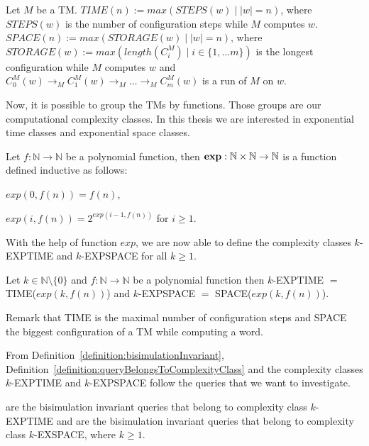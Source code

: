 \begin{definition}
    Let $M$ be a TM. $TIME(n):= max(STEPS(w)\mid |w| = n)$, where $STEPS(w)$ is the number of configuration steps while
    $M$ computes $w$. $SPACE(n) := max(STORAGE(w)\mid |w| = n)$, where $STORAGE(w) := max(length(C_i^M)\mid i\in\{1,
    \dots m\})$ is the longest configuration while $M$ computes $w$ and $C_0^M(w) \rightarrow_M C_1^M(w) \rightarrow_M \dots
    \rightarrow_M C_m^M(w)$ is a run of $M$ on $w$.
\end{definition}

Now, it is possible to group the TMs by functions. Those groups are our computational complexity classes. In this
thesis we are interested in exponential time classes and exponential space classes.

\begin{definition}
    Let $f: \mathbb{N} \rightarrow \mathbb{N}$ be a polynomial function, then $\emph{exp}: \mathbb{N} \times \mathbb{N}
    \rightarrow \mathbb{N}$ is a function defined inductive as follows:
    \begin{compactitem}
        \item $exp(0, f(n)) = f(n)$,
        \item $exp(i, f(n)) = 2^{exp(i - 1, f(n))}$ for $i \geq 1$.
    \end{compactitem}
\end{definition}

With the help of function $exp$, we are now able to define the complexity classes $k$-EXPTIME and $k$-EXPSPACE for
all $k \geq 1$.

\begin{definition}
    Let $k \in \mathbb{N} \setminus \{0\}$ and $f: \mathbb{N} \rightarrow \mathbb{N}$ be a polynomial function then
    $k$-EXPTIME $=$ TIME($exp(k, f(n))$) and $k$-EXPSPACE $=$ SPACE($exp(k, f(n))$).
\end{definition}

Remark that TIME is the maximal number of configuration steps and SPACE the biggest configuration of a TM
while computing a word.

From Definition~\ref{definition:bisimulationInvariant}, Definition~\ref{definition:queryBelongsToComplexityClass}
and the complexity classes $k$-EXPTIME and $k$-EXPSPACE follow the queries that we want to investigate.

\begin{definition}
    \label{definition:kExptimekExpspace}
     are the bisimulation invariant queries that belong to complexity class $k$-EXPTIME and
     are the bisimulation invariant queries that belong to complexity class $k$-EXSPACE, where $k \geq 1$.
\end{definition}


